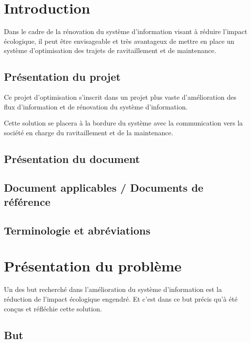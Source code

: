 \section{Introduction}

        Dans le cadre de la rénovation du système d'information visant à réduire l'impact écologique, il peut être envisageable et très avantageux de mettre en place un système d'optimisation des trajets de ravitaillement et de maintenance.

    \subsection{Présentation du projet}
    
        Ce projet d'optimisation s'inscrit dans un projet plus vaste d'amélioration des flux d'information et de rénovation du système d'information.
        
        Cette solution se placera à la bordure du système avec la communication vers la société en charge du ravitaillement et de la maintenance.
        
    \subsection{Présentation du document}
        
        
    \subsection{Document applicables / Documents de référence}
    
    \subsection{Terminologie et abréviations}
    
\section{Présentation du problème}
        
        Un des but recherché dans l'amélioration du système d'information est la réduction de l'impact écologique engendré. Et c'est dans ce but précis qu'à été conçus et réfléchie cette solution.
        
    \subsection{But}
    
